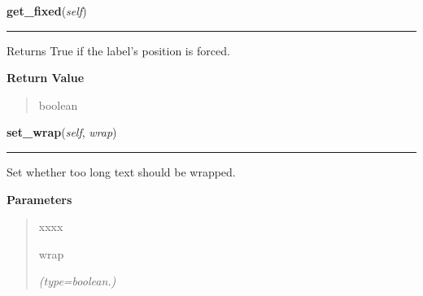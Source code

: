     \label{pygtk_chart:label:Label:get_fixed}

    \vspace{0.5ex}

\hspace{.8\funcindent}\begin{boxedminipage}{\funcwidth}

    \raggedright \textbf{get\_fixed}(\textit{self})

    \vspace{-1.5ex}

    \rule{\textwidth}{0.5\fboxrule}
\setlength{\parskip}{2ex}
    Returns True if the label's position is forced.

\setlength{\parskip}{1ex}
      \textbf{Return Value}
    \vspace{-1ex}

      \begin{quote}
      boolean

      \end{quote}

    \end{boxedminipage}

    \label{pygtk_chart:label:Label:set_wrap}

    \vspace{0.5ex}

\hspace{.8\funcindent}\begin{boxedminipage}{\funcwidth}

    \raggedright \textbf{set\_wrap}(\textit{self}, \textit{wrap})

    \vspace{-1.5ex}

    \rule{\textwidth}{0.5\fboxrule}
\setlength{\parskip}{2ex}
    Set whether too long text should be wrapped.

\setlength{\parskip}{1ex}
      \textbf{Parameters}
      \vspace{-1ex}

      \begin{quote}
        \begin{Ventry}{xxxx}

          \item[wrap]

            {\it (type=boolean.)}

        \end{Ventry}

      \end{quote}

    \end{boxedminipage}

